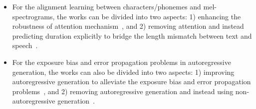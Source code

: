 \documentclass{article}
\begin{document}
\begin{itemize}[leftmargin=*]
    \item For the alignment learning between characters/phonemes and mel-spectrograms, the works can be divided into two aspects: 1) enhancing the robustness of attention mechanism~\cite{wang2017tacotron,sotelo2017char2wav,shen2018natural,zhang2018forward,tachibana2018efficiently,he2019robust,chen2020multispeech}, and 2) removing attention and instead predicting duration explicitly to bridge the length mismatch between text and speech~\cite{ren2019fastspeech,yu2020durian,donahue2020end,elias2021parallel}.
    \item For the exposure bias and error propagation problems in autoregressive generation, the works can also be divided into two aspects: 1) improving autoregressive generation to alleviate the exposure bias and error propagation problems~\cite{guo2019new,liu2019new,liu2020teacher,ren2019almost}, and 2) removing autoregressive generation and instead using non-autoregressive generation~\cite{ren2019fastspeech,ren2021fastspeech,peng2020non,donahue2020end}.
\end{itemize}
\end{document}
